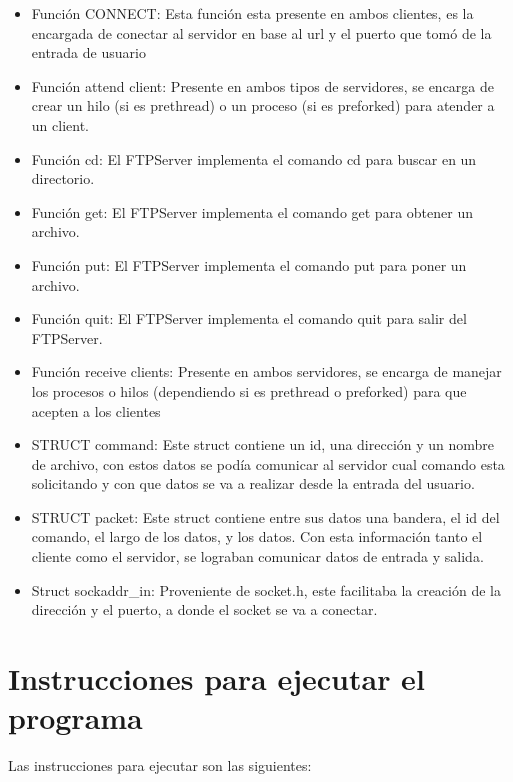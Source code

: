 \documentclass[a4paper,12pt,twoside]{article}
\begin{document}
\begin{itemize}
    \item Función CONNECT: Esta función esta presente en ambos clientes, es la
encargada de conectar al servidor en base al url y el puerto que tomó de
la entrada de usuario
    \item Función attend client: Presente en ambos tipos de servidores, se encarga
de crear un hilo (si es prethread) o un proceso (si es preforked) para
atender a un client.
    \item Función cd: El FTPServer implementa el comando cd para buscar en un directorio. 
    \item Función get: El FTPServer implementa el comando get para obtener un archivo. 
    \item Función put: El FTPServer implementa el comando put para poner un archivo. 
    \item Función quit: El FTPServer implementa el comando quit para salir del FTPServer. 
    \item Función receive clients: Presente en ambos servidores, se encarga de manejar los procesos o hilos (dependiendo si es prethread o preforked) para que
acepten a los clientes
    \item STRUCT command: Este struct contiene un id, una dirección y un nombre de archivo, con estos datos se podía comunicar al servidor cual comando esta solicitando y con que datos se va a realizar desde la entrada del usuario. 
    \item STRUCT packet: Este struct contiene entre sus datos una bandera, el id del comando, el largo de los datos, y los datos. Con esta información tanto el cliente como el servidor, se lograban comunicar datos de entrada y salida.
    \item  Struct sockaddr\_in: Proveniente de socket.h, este facilitaba la creación de la dirección y el puerto, a donde el socket se va a conectar. 
\end{itemize}

\newpage
\section{Instrucciones para ejecutar el programa}

Las instrucciones para ejecutar son las siguientes: 
\end{document}
